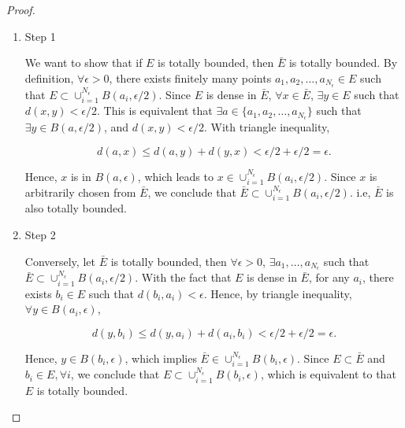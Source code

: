 \documentclass[12pt]{article}
\begin{document}
\begin{proof}

\begin{enumerate}
\item Step 1

We want to show that if $E$ is totally bounded, then $\bar E$ is totally bounded. By definition, $\forall \epsilon >0$, there exists finitely many points $a_1, a_2, \dots, a_{N_\epsilon} \in E$ such that $E \subset \cup_{i=1}^{N_\epsilon} B(a_i, \epsilon/2)$. Since $E$ is dense in $\bar E$, $\forall x \in \bar E$, $\exists y \in E$ such that $d(x, y)<\epsilon/2$. This is equivalent that $\exists a \in \{a_1, a_2, \dots, a_{N_\epsilon}\}$ such that $\exists y \in B(a, \epsilon/2)$, and $d(x, y) < \epsilon/2$. With triangle inequality, 

$$
d(a, x) \leqslant d(a, y) + d(y, x) < \epsilon/2 + \epsilon/2 = \epsilon.
$$

Hence, $x$ is in $B(a, \epsilon)$, which leads to $x \in \cup_{i=1}^{N_\epsilon} B(a_i, \epsilon/2)$. Since $x$ is arbitrarily chosen from $\bar E$, we conclude that $\bar E \subset \cup_{i=1}^{N_\epsilon} B(a_i, \epsilon/2)$. i.e, $\bar E$ is also totally bounded.

\item Step 2

Conversely, let $\bar E$ is totally bounded, then $\forall \epsilon > 0$, $\exists a_1, \dots, a_{N_\epsilon}$ such that $\bar E \subset \cup_{i=1}^{N_\epsilon} B(a_i, \epsilon/2)$. With the fact that $E$ is dense in $\bar E$, for any $a_i$, there exists $b_i \in E$ such that $d(b_i, a_i)<\epsilon$. Hence, by triangle inequality, $\forall y \in B(a_i, \epsilon)$, 

$$
d(y, b_i) \leqslant d(y, a_i) + d(a_i, b_i) < \epsilon/2 + \epsilon/2 = \epsilon.
$$

Hence, $y \in B(b_i, \epsilon)$, which implies $\bar E \in \cup_{i=1}^{N_\epsilon} B(b_i, \epsilon)$. Since $E\subset \bar E$ and $b_i \in E, \forall i$, we conclude that $E \subset \cup_{i=1}^{N_\epsilon} B(b_i, \epsilon)$, which is equivalent to that $E$ is totally bounded.


\end{enumerate}

\end{proof}
\end{document}
